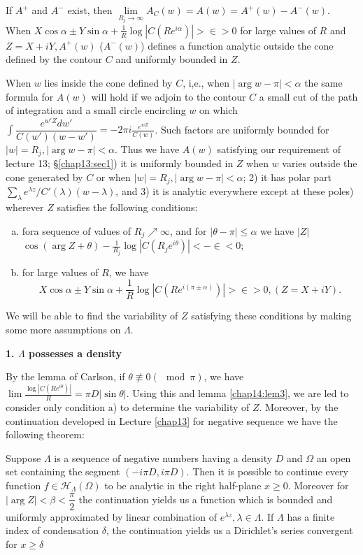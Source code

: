 If $A^+$ and $A^-$ exist, then $\lim\limits_{R_j \to \infty} A_C(w) =
A(w) = A^+ (w) - A^-(w)$. When $X \cos \alpha \pm Y \sin \alpha +
\frac{1}{R} \log |C(R e^{i \alpha })| > \in > 0 $ for large
values of $R$ and $Z = X+iY, A^+ (w)$ (\resp $A^- (w)$) defines a
function analytic outside the cone defined by the contour $C$ and
uniformly bounded in $Z$. 

When $w$ lies inside the cone defined by $C$, i,e., when $|\arg w -\pi|
< \alpha $ the same formula for $A(w)$ will hold if we adjoin to the
contour $C$ a small cut of the path of integration and a small circle
encircling $w$ on which $\int \dfrac{e^{w'Z} dw'} {C(w') (w-w')} = -2 \pi
i \frac{e^{wZ}} {C(w)}$. Such factors are uniformly bounded for $|w| =
R_j, |\arg w -\pi | < \alpha $. Thus we have $A(w)$ satisfying our
requirement of lecture 13; \S\ref{chap13:sec1}) it is uniformly bounded in $Z$
when $w$ varies outside the cone generated by $C$ or when $|w|= R_j,
|\arg w -\pi | < \alpha$; 2) it has polar part $ \sum\limits_\lambda
e^{\lambda z}/C' (\lambda) (w-\lambda)$, and 3) it is analytic
everywhere except at these poles) wherever $Z$ satisfies the
following conditions: 
\begin{enumerate}[a)]
\item for\pageoriginale a sequence of values of $R_j \nearrow \infty$, and for
 $|\theta -\pi| \le \alpha $ we have $|Z|$ $ \cos (\arg Z+\theta) -
 \frac{1}{R_j} \log | C(R_j e^{i \theta})| < -\in < 0$; 
\item for large values of $R$, we have 
$$X \cos \alpha \pm Y \sin
 \alpha + \frac{1}{R} \log | C (Re^{i (\pi \pm \alpha )})| >
 \in > 0, (Z= X + i Y).$$ 
\end{enumerate}

We will be able to find the variability of $Z$ satisfying these
conditions by making some more assumptions on $\Lambda$. 
\medskip

\noindent\textbf{1. $\Lambda$ possesses a density}

By the lemma of Carlson, if $\theta \nequiv 0 (\mod \pi)$, we have
{\small$\lim \frac{\log |C (R e^{i \theta})|} {R} = \pi D |\sin
\theta|$}. Using this and lemma \ref{chap14:lem3}, we are led to consider only
condition a) to determine the variability of $Z$. Moreover, by the
continuation developed in Lecture \ref{chap13} for negative sequence we have
the following theorem: 
\begin{theorem*}
 Suppose $\Lambda$ is a sequence of negative numbers having a density
 $D$ and $\Omega$ an open set containing the segment $(-i \pi D, i
 \pi D)$. Then it is possible to continue every function $f
 \in \mathscr{H}_\Lambda (\Omega)$ to be analytic in the
 right half-plane $ x \ge 0$. Moreover for $|\arg Z | < \beta <
 \dfrac{\pi}{2}$ the continuation yields us a function which is
 bounded and uniformly approximated by linear combination of
 $e^{\lambda z}, \lambda \in \Lambda$. If $\Lambda$ has a
 finite index of condensation $\delta$, the continuation yields us a
 Dirichlet's series convergent for $x \ge \delta$ 
\end{theorem*}


